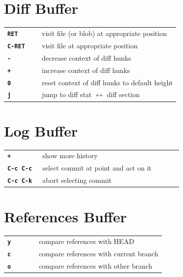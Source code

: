 \documentclass[9pt]{extarticle} %
\begin{document}
\begin{multicols}{3}
  \vspace{5ex}

  \section*{Diff Buffer}

  \begin{tabular}{L{0.20\linewidth} L{0.80\linewidth}}
    \tt \textbf{RET} & visit file (or blob) at appropriate position \\
    \tt \textbf{C-RET} & visit file at appropriate position \\
    \tt \textbf{-} & decrease context of diff hunks \\
    \tt \textbf{+} & increase context of diff hunks \\
    \tt \textbf{0} & reset context of diff hunks to default height \\
    \tt \textbf{j} & jump to diff stat $\leftrightarrow$ diff section
  \end{tabular}

  \vspace{5ex}

  \section*{Log Buffer}

  \begin{tabular}{L{0.20\linewidth} L{0.80\linewidth}}
    \tt \textbf{+} & show more history \\
    \tt \textbf{C-c C-c} & select commit at point and act on it \\
    \tt \textbf{C-c C-k} & abort selecting commit
  \end{tabular}

  \columnbreak

  \section*{References Buffer}

  \begin{tabular}{L{0.20\linewidth} L{0.80\linewidth}}
    \tt \textbf{y} & compare references with HEAD \\
    \tt \textbf{c} & compare references with current branch \\
    \tt \textbf{o} & compare references with other branch
  \end{tabular}

  \vspace{5ex}


\end{multicols}
\end{document}
